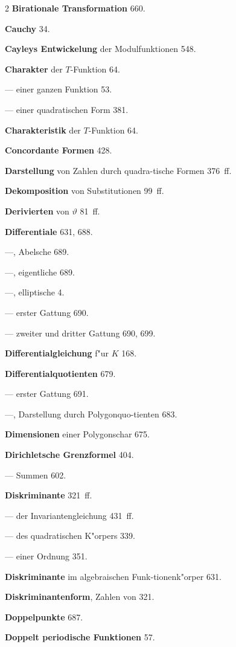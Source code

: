 \documentclass[12pt,a4paper]{article}
\begin{document}
\begin{multicols}{2}
\textbf{Birationale Transformation} 660.

\bigskip

\textbf{Cauchy} 34.

\textbf{Cayleys Entwickelung} der Modulfunktionen 548.

\textbf{Charakter} der $T$-Funktion 64.

--- einer ganzen Funktion 53.

--- einer quadratischen Form 381.

\textbf{Charakteristik} der $T$-Funktion 64.

\textbf{Concordante Formen} 428.

\bigskip

\textbf{Darstellung} von Zahlen durch quadra{-}tische Formen 376~ff.

\textbf{Dekomposition} von Substitutionen 99~ff.

\textbf{Derivierten} von $\vartheta$ 81~ff.

\textbf{Differentiale} 631, 688.

---, Abelsche 689.

---, eigentliche 689.

---, elliptische 4.

--- erster Gattung 690.

--- zweiter und dritter Gattung 690, 699.

\textbf{Differentialgleichung} f"ur $K$ 168.

\textbf{Differentialquotienten} 679.

--- erster Gattung 691.

---, Darstellung durch Polygonquo{-}tienten 683.

\textbf{Dimensionen} einer Polygonschar 675.

\textbf{Dirichletsche Grenzformel} 404.

--- Summen 602.

\textbf{Diskriminante} 321~ff.

--- der Invariantengleichung 431~ff.

--- des quadratischen K"orpers 339.

--- einer Ordnung 351.

\columnbreak

\textbf{Diskriminante} im algebraischen Funk{-}tionenk"orper 631.

\textbf{Diskriminantenform}, Zahlen von 321.

\textbf{Doppelpunkte} 687.

\textbf{Doppelt periodische Funktionen} 57.


\end{multicols}
\end{document}
